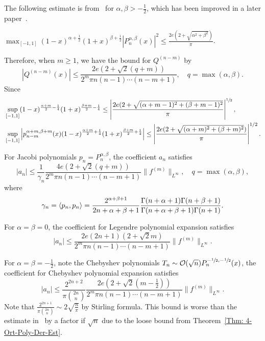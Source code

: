 The following estimate is from~\cite{nevai1994generalized} for $\alpha, \beta > -\frac{1}{2}$, which has been improved in a later paper~\cite{krasikov2005maximum}. 
\begin{theorem}
\label{Thm: 4-Ort-Poly-Der-Est}
    $\max_{[-1,1]} (1-x)^{\alpha+\frac{1}{2}}(1+x)^{\beta+\frac{1}{2}} \left|P^{\alpha,\beta}_n(x)\right|^2 \le \frac{2e (2 + \sqrt{\alpha^2+\beta^2})}{\pi}$. 
\end{theorem}
Therefore, when $m \ge 1$, we have the bound for $Q^{(n-m)}$ by 
\begin{equation}
    |Q^{(n-m)}(x)| \le \frac{ 2e(2+\sqrt{2}(q+m)) }{2^m \pi n (n-1)\cdots(n-m+1)}, \quad q = \max(\alpha, \beta). 
\end{equation}
Since 
\begin{equation*}
\begin{aligned}
    &\sup_{[-1,1]} (1-x)^{\frac{\alpha+m}{2}-\frac{1}{4}} (1+x)^{\frac{\beta+m}{2} - \frac{1}{4}} \le \left|\frac{2e(2+\sqrt{(\alpha+m-1)^2 + (\beta+m-1)^2}}{\pi}\right|^{\sfrac{1}{2}},  \\
    &\sup_{[-1, 1]} \left| p_{n-m}^{\alpha+m, \beta+m}(x) (1 - x)^{\frac{\alpha+m}{2}+\frac{1}{4}} (1+x)^{\frac{\beta+m}{2}+\frac{1}{4}}  \right|\le \left|\frac{2e(2 + \sqrt{ (\alpha+m)^2 + (\beta+m)^2 })}{\pi}\right|^{1/2}.
\end{aligned}
\end{equation*}
\begin{theorem}
\label{Thm: 4-Jac-Bou-Coe}
For Jacobi polynomials $p_n = P_{n}^{\alpha, \beta}$, the coefficient $a_n$ satisfies 
   $$|a_n|\le \frac{1}{\gamma_n} \frac{4e(2+\sqrt{2}(q+m))}{2^m \pi n(n-1)\cdots (n - m+1)}\|f^{(m)}\|_{L^{\infty}}, \quad q= \max(\alpha, \beta), $$
where 
    \begin{equation}
        \gamma_n = \langle {p_n, p_n} \rangle = \frac{2^{\alpha + \beta + 1}}{2n+\alpha + \beta + 1} \frac{\Gamma(n+\alpha+1)\Gamma(n+\beta + 1)}{\Gamma(n+\alpha+\beta + 1)\Gamma(n+1)}.
    \end{equation}
\end{theorem}
\begin{example}
For $\alpha = \beta = 0$, the coefficient for Legendre polynomial expansion satisfies $$|a_n|\le \frac{2e(2n+1)(2+\sqrt{2}m) }{2^m \pi n(n-1)\cdots (n - m+1)}\|f^{(m)}\|_{L^{\infty}}. $$
\end{example}
\begin{example}
For $\alpha = \beta = -\frac{1}{2}$, note the Chebyshev polynomials $T_n\sim \mathcal O(\sqrt{n}) P_n^{-\sfrac{1}{2}, -\sfrac{1}{2}}(x)$, the coefficient for Chebyshev polynomial expansion satisfies 
$$ |a_n| \le \frac{2^{2n+2}}{\pi\binom{2n}{n}}\frac{2e(2+\sqrt{2}(m-\frac{1}{2}))}{2^m \pi n (n-1)\cdots (n-m+1)} \|f^{(m)}\|_{L^{\infty}}. $$
Note that $\frac{2^{2n+1}}{\pi\binom{2n}{n}}\sim 2\sqrt{\frac{n}{\pi}}$ by Stirling formula. This bound is worse than the estimate in~\cite{trefethen2019approximation} by a factor if $\sqrt{n}$ due to the loose bound from Theorem~\ref{Thm: 4-Ort-Poly-Der-Est}. 
\end{example}

